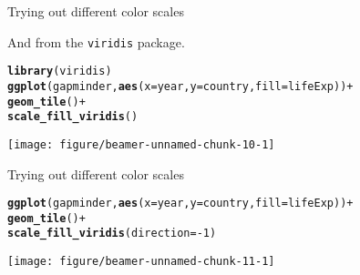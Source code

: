 \documentclass[table]{beamer}\usepackage[]{graphicx}\usepackage[]{color}
\makeatletter
\def\maxwidth{ %
  \ifdim\Gin@nat@width>\linewidth
    \linewidth
  \else
    \Gin@nat@width
  \fi
}
\newcommand{\hlnum}[1]{\textcolor[rgb]{0.686,0.059,0.569}{#1}}%
\newcommand{\hlopt}[1]{\textcolor[rgb]{0,0,0}{#1}}%
\newcommand{\hlstd}[1]{\textcolor[rgb]{0.345,0.345,0.345}{#1}}%
\newcommand{\hlkwc}[1]{\textcolor[rgb]{0.333,0.667,0.333}{#1}}%
\newcommand{\hlkwd}[1]{\textcolor[rgb]{0.737,0.353,0.396}{\textbf{#1}}}%
\newenvironment{kframe}{%
 \def\at@end@of@kframe{}%
 \ifinner\ifhmode%
  \def\at@end@of@kframe{\end{minipage}}%
  \begin{minipage}{\columnwidth}%
 \fi\fi%
 \def\FrameCommand##1{\hskip\@totalleftmargin \hskip-\fboxsep
 \colorbox{shadecolor}{##1}\hskip-\fboxsep
     \hskip-\linewidth \hskip-\@totalleftmargin \hskip\columnwidth}%
 \MakeFramed {\advance\hsize-\width
   \@totalleftmargin\z@ \linewidth\hsize
   \@setminipage}}%
 {\par\unskip\endMakeFramed%
 \at@end@of@kframe}
\newenvironment{knitrout}{}{} %
\makeatother
\begin{document}

\begin{frame}[fragile]{Trying out different color scales}

And from the {\tt viridis} package.

\begin{knitrout}\tiny
{}\color{fgcolor}\begin{kframe}
\begin{alltt}
\hlkwd{library}\hlstd{(viridis)}
\hlkwd{ggplot}\hlstd{(gapminder,} \hlkwd{aes}\hlstd{(}\hlkwc{x}\hlstd{=year,} \hlkwc{y}\hlstd{=country,} \hlkwc{fill}\hlstd{=lifeExp))} \hlopt{+}
    \hlkwd{geom_tile}\hlstd{()} \hlopt{+}
    \hlkwd{scale_fill_viridis}\hlstd{()}
\end{alltt}
\end{kframe}

{\centering \texttt{[image: figure/beamer-unnamed-chunk-10-1]} 

}



\end{knitrout}

\end{frame}


\begin{frame}[fragile]{Trying out different color scales}

\begin{knitrout}\tiny
{}\color{fgcolor}\begin{kframe}
\begin{alltt}
\hlkwd{ggplot}\hlstd{(gapminder,} \hlkwd{aes}\hlstd{(}\hlkwc{x}\hlstd{=year,} \hlkwc{y}\hlstd{=country,} \hlkwc{fill}\hlstd{=lifeExp))} \hlopt{+}
    \hlkwd{geom_tile}\hlstd{()} \hlopt{+}
    \hlkwd{scale_fill_viridis}\hlstd{(}\hlkwc{direction}\hlstd{=}\hlopt{-}\hlnum{1}\hlstd{)}
\end{alltt}
\end{kframe}

{\centering \texttt{[image: figure/beamer-unnamed-chunk-11-1]} 

}



\end{knitrout}

\end{frame}
\end{document}
